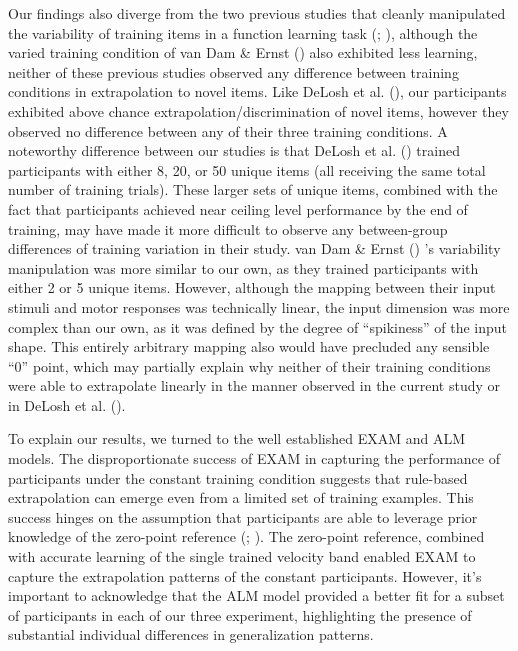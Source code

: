 \documentclass[
  11pt,
  letterpaper,
]{article}
\begin{document}
Our findings also diverge from the two previous studies that cleanly
manipulated the variability of training items in a function learning
task (; ), although the varied training condition of van Dam \& Ernst
() also exhibited
less learning, neither of these previous studies observed any difference
between training conditions in extrapolation to novel items. Like DeLosh
et al. (), our
participants exhibited above chance extrapolation/discrimination of
novel items, however they observed no difference between any of their
three training conditions. A noteworthy difference between our studies
is that DeLosh et al.
() trained
participants with either 8, 20, or 50 unique items (all receiving the
same total number of training trials). These larger sets of unique
items, combined with the fact that participants achieved near ceiling
level performance by the end of training, may have made it more
difficult to observe any between-group differences of training variation
in their study. van Dam \& Ernst
() 's variability
manipulation was more similar to our own, as they trained participants
with either 2 or 5 unique items. However, although the mapping between
their input stimuli and motor responses was technically linear, the
input dimension was more complex than our own, as it was defined by the
degree of ``spikiness'' of the input shape. This entirely arbitrary
mapping also would have precluded any sensible ``0'' point, which may
partially explain why neither of their training conditions were able to
extrapolate linearly in the manner observed in the current study or in
DeLosh et al. ().

To explain our results, we turned to the well established EXAM and ALM
models. The disproportionate success of EXAM in capturing the
performance of participants under the constant training condition
suggests that rule-based extrapolation can emerge even from a limited
set of training examples. This success hinges on the assumption that
participants are able to leverage prior knowledge of the zero-point
reference (;
). The zero-point reference, combined with accurate learning of the
single trained velocity band enabled EXAM to capture the extrapolation
patterns of the constant participants. However, it's important to
acknowledge that the ALM model provided a better fit for a subset of
participants in each of our three experiment, highlighting the presence
of substantial individual differences in generalization patterns.
\end{document}
